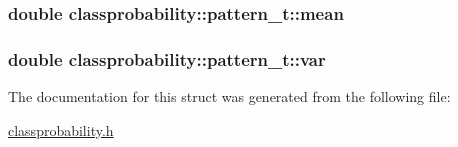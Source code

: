 \subsubsection[{\texorpdfstring{mean}{mean}}]{\setlength{\rightskip}{0pt plus 5cm}double classprobability\+::pattern\+\_\+t\+::mean}\hypertarget{structclassprobability_1_1pattern__t_a68544f1b50aefe88c8880ae71d4ab42a}{}\label{structclassprobability_1_1pattern__t_a68544f1b50aefe88c8880ae71d4ab42a}
\subsubsection[{\texorpdfstring{var}{var}}]{\setlength{\rightskip}{0pt plus 5cm}double classprobability\+::pattern\+\_\+t\+::var}\hypertarget{structclassprobability_1_1pattern__t_a1077c7811bcaa315e33e0a3e2d6ecfc8}{}\label{structclassprobability_1_1pattern__t_a1077c7811bcaa315e33e0a3e2d6ecfc8}


The documentation for this struct was generated from the following file\+:\begin{DoxyCompactItemize}
\item 
\hyperlink{classprobability_8h}{classprobability.\+h}\end{DoxyCompactItemize}

